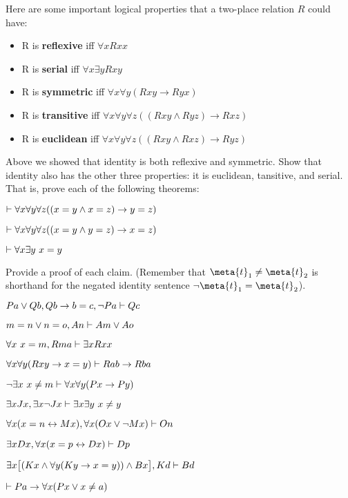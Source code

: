 \practiceproblems

\problempart Here are some important logical properties that a two-place relation $R$ could have:

\begin{itemize}
\item[] R is \textbf{reflexive} iff $\forall x Rxx$
\item[] R is \textbf{serial} iff $\forall x \exists y Rxy$
\item[] R is \textbf{symmetric} iff $\forall x \forall y(Rxy \rightarrow Ryx)$
\item[] R is \textbf{transitive} iff $\forall x \forall y \forall z((Rxy \land Ryz) \rightarrow Rxz)$
\item[] R is \textbf{euclidean} iff $\forall x \forall y \forall z((Rxy \land Rxz) \rightarrow Ryz)$
\end{itemize}

\noindent Above we showed that identity is both reflexive and symmetric.  Show that identity also has the other three properties: it is euclidean, tansitive, and serial.  That is, prove each of the following theorems:

\begin{earg}
\item $\vdash \forall x \forall y \forall z((x=y \land x=z) \rightarrow y = z)$
\item $\vdash \forall x \forall y \forall z((x=y \land y = z) \rightarrow x = z)$
\item $\vdash \forall x \exists y \ x = y$
\end{earg}




\problempart
\label{pr.identity}
Provide a proof of each claim. (Remember that $\meta{t}_1 \neq \meta{t}_2$ is shorthand for the negated identity sentence $\enot \meta{t}_1 = \meta{t}_2$).
\begin{earg}
\item $Pa \vee Qb, Qb \rightarrow b=c, \neg Pa \vdash Qc$
\item $m=n \vee n=o, An \vdash Am \vee Ao$
\item $\forall x\ x=m, Rma\vdash \exists x Rxx$
\item $\forall x\forall y(Rxy \rightarrow x=y)\vdash Rab \rightarrow Rba$
\item $\neg \exists x \ x \neq m \vdash \forall x\forall y (Px \rightarrow Py)$
\item $\exists x Jx, \exists x \neg Jx\vdash \exists x \exists y\ x \neq y$
\item $\forall x(x=n \leftrightarrow Mx), \forall x(Ox \vee \neg Mx)\vdash On$
\item $\exists x Dx, \forall x(x=p \leftrightarrow Dx)\vdash Dp$
\item $\exists x\bigl[(Kx \wedge \forall y(Ky \rightarrow x=y)) \wedge Bx\bigr], Kd\vdash Bd$
\item $\vdash Pa \rightarrow \forall x(Px \vee  x \neq a)$
\end{earg}


